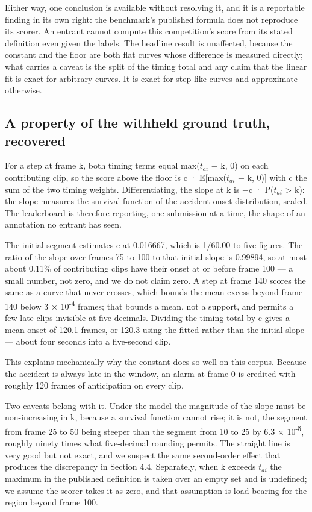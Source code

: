 Either way, one conclusion is available without resolving it, and it is a reportable finding in its own right: the benchmark's published formula does not reproduce its scorer. An entrant cannot compute this competition's score from its stated definition even given the labels. The headline result is unaffected, because the constant and the floor are both flat curves whose difference is measured directly; what carries a caveat is the split of the timing total and any claim that the linear fit is exact for arbitrary curves. It is exact for step-like curves and approximate otherwise.


\subsection{A property of the withheld ground truth, recovered}
For a step at frame k, both timing terms equal max(\(t_{ai}\) − k, 0) on each contributing clip, so the score above the floor is c · E[max(\(t_{ai}\) − k, 0)] with c the sum of the two timing weights. Differentiating, the slope at k is −c · P(\(t_{ai}\) \textgreater{} k): the slope measures the survival function of the accident-onset distribution, scaled. The leaderboard is therefore reporting, one submission at a time, the shape of an annotation no entrant has seen.

The initial segment estimates c at 0.016667, which is 1/60.00 to five figures. The ratio of the slope over frames 75 to 100 to that initial slope is 0.99894, so at most about 0.11\% of contributing clips have their onset at or before frame 100 --- a small number, not zero, and we do not claim zero. A step at frame 140 scores the same as a curve that never crosses, which bounds the mean excess beyond frame 140 below 3 × 10\textsuperscript{-4} frames; that bounds a mean, not a support, and permits a few late clips invisible at five decimals. Dividing the timing total by c gives a mean onset of 120.1 frames, or 120.3 using the fitted rather than the initial slope --- about four seconds into a five-second clip.

This explains mechanically why the constant does so well on this corpus. Because the accident is always late in the window, an alarm at frame 0 is credited with roughly 120 frames of anticipation on every clip.

Two caveats belong with it. Under the model the magnitude of the slope must be non-increasing in k, because a survival function cannot rise; it is not, the segment from frame 25 to 50 being steeper than the segment from 10 to 25 by 6.3 × 10\textsuperscript{-5}, roughly ninety times what five-decimal rounding permits. The straight line is very good but not exact, and we suspect the same second-order effect that produces the discrepancy in Section 4.4. Separately, when k exceeds \(t_{ai}\) the maximum in the published definition is taken over an empty set and is undefined; we assume the scorer takes it as zero, and that assumption is load-bearing for the region beyond frame 100.


